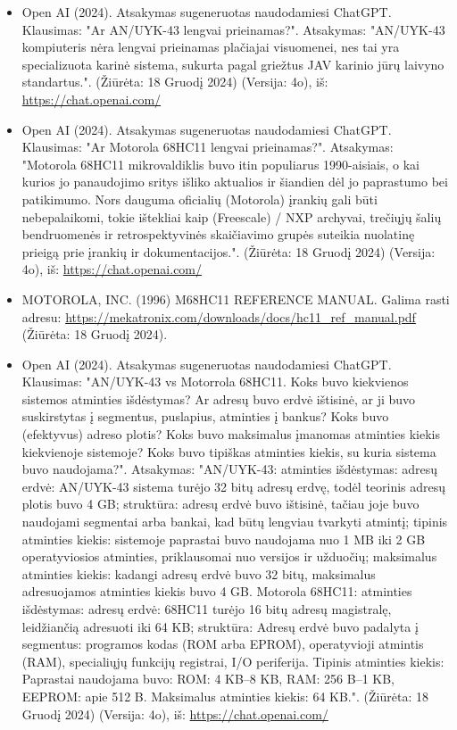 \documentclass[a4paper,12pt]{article}
\begin{document}
\begin{itemize}
    \item Open AI (2024). Atsakymas sugeneruotas naudodamiesi ChatGPT. Klausimas: "Ar AN/UYK-43 lengvai prieinamas?". Atsakymas: "AN/UYK-43 kompiuteris nėra lengvai prieinamas plačiajai visuomenei, nes tai yra specializuota karinė sistema, sukurta pagal griežtus JAV karinio jūrų laivyno standartus.". (Žiūrėta: 18 Gruodį 2024) (Versija: 4o), iš: \url{https://chat.openai.com/}
    \item Open AI (2024). Atsakymas sugeneruotas naudodamiesi ChatGPT. Klausimas: "Ar Motorola 68HC11 lengvai prieinamas?". Atsakymas: "Motorola 68HC11 mikrovaldiklis buvo itin populiarus 1990-aisiais, o kai kurios jo panaudojimo sritys išliko aktualios ir šiandien dėl jo paprastumo bei patikimumo. Nors dauguma oficialių (Motorola) įrankių gali būti nebepalaikomi, tokie ištekliai kaip (Freescale) / NXP archyvai, trečiųjų šalių bendruomenės ir retrospektyvinės skaičiavimo grupės suteikia nuolatinę prieigą prie įrankių ir dokumentacijos.". (Žiūrėta: 18 Gruodį 2024) (Versija: 4o), iš: \url{https://chat.openai.com/}
    \item MOTOROLA, INC. (1996) M68HC11 REFERENCE MANUAL. Galima rasti adresu: \url{https://mekatronix.com/downloads/docs/hc11_ref_manual.pdf} (Žiūrėta: 18 Gruodį 2024).
    \item Open AI (2024). Atsakymas sugeneruotas naudodamiesi ChatGPT. Klausimas: "AN/UYK-43 vs Motorrola 68HC11. Koks buvo kiekvienos sistemos atminties išdėstymas? Ar adresų buvo erdvė ištisinė, ar ji buvo suskirstytas į segmentus, puslapius, atminties į bankus? Koks buvo (efektyvus) adreso plotis? Koks buvo maksimalus įmanomas atminties kiekis kiekvienoje sistemoje? Koks buvo tipiškas atminties kiekis, su kuria sistema buvo naudojama?". Atsakymas: "AN/UYK-43: atminties išdėstymas: adresų erdvė: AN/UYK-43 sistema turėjo 32 bitų adresų erdvę, todėl teorinis adresų plotis buvo 4 GB; struktūra: adresų erdvė buvo ištisinė, tačiau joje buvo naudojami segmentai arba bankai, kad būtų lengviau tvarkyti atmintį; tipinis atminties kiekis: sistemoje paprastai buvo naudojama nuo 1 MB iki 2 GB operatyviosios atminties, priklausomai nuo versijos ir užduočių; maksimalus atminties kiekis: kadangi adresų erdvė buvo 32 bitų, maksimalus adresuojamos atminties kiekis buvo 4 GB.
Motorola 68HC11: atminties išdėstymas: adresų erdvė: 68HC11 turėjo 16 bitų adresų magistralę, leidžiančią adresuoti iki 64 KB; struktūra: Adresų erdvė buvo padalyta į segmentus: programos kodas (ROM arba EPROM), operatyvioji atmintis (RAM), specialiųjų funkcijų registrai, I/O periferija.
Tipinis atminties kiekis: Paprastai naudojama buvo: ROM: 4 KB–8 KB, RAM: 256 B–1 KB, EEPROM: apie 512 B. Maksimalus atminties kiekis: 64 KB.". (Žiūrėta: 18 Gruodį 2024) (Versija: 4o), iš: \url{https://chat.openai.com/}

\end{itemize}
\end{document}
